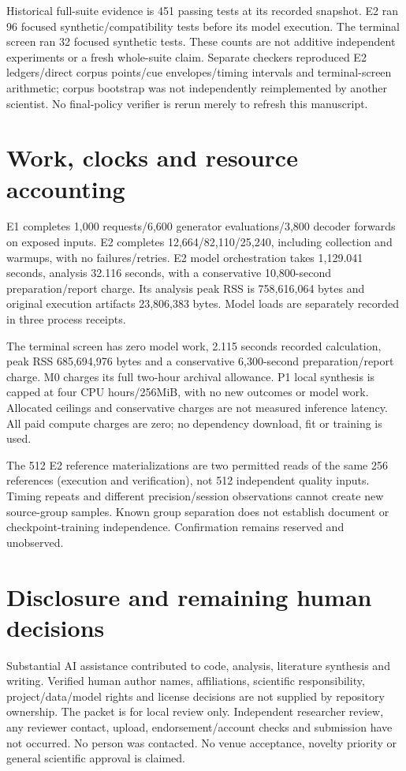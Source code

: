 \documentclass[11pt]{article}
\begin{document}
Historical full-suite evidence is 451 passing tests at its recorded snapshot. E2 ran 96 focused synthetic/compatibility tests before its model execution. The terminal screen ran 32 focused synthetic tests. These counts are not additive independent experiments or a fresh whole-suite claim. Separate checkers reproduced E2 ledgers/direct corpus points/cue envelopes/timing intervals and terminal-screen arithmetic; corpus bootstrap was not independently reimplemented by another scientist. No final-policy verifier is rerun merely to refresh this manuscript.

\section{Work, clocks and resource accounting}
E1 completes 1,000 requests/6,600 generator evaluations/3,800 decoder forwards on exposed inputs. E2 completes 12,664/82,110/25,240, including collection and warmups, with no failures/retries. E2 model orchestration takes 1,129.041 seconds, analysis 32.116 seconds, with a conservative 10,800-second preparation/report charge. Its analysis peak RSS is 758,616,064 bytes and original execution artifacts 23,806,383 bytes. Model loads are separately recorded in three process receipts.

The terminal screen has zero model work, 2.115 seconds recorded calculation, peak RSS 685,694,976 bytes and a conservative 6,300-second preparation/report charge. M0 charges its full two-hour archival allowance. P1 local synthesis is capped at four CPU hours/256MiB, with no new outcomes or model work. Allocated ceilings and conservative charges are not measured inference latency. All paid compute charges are zero; no dependency download, fit or training is used.

The 512 E2 reference materializations are two permitted reads of the same 256 references (execution and verification), not 512 independent quality inputs. Timing repeats and different precision/session observations cannot create new source-group samples. Known group separation does not establish document or checkpoint-training independence. Confirmation remains reserved and unobserved.

\section{Disclosure and remaining human decisions}
Substantial AI assistance contributed to code, analysis, literature synthesis and writing. Verified human author names, affiliations, scientific responsibility, project/data/model rights and license decisions are not supplied by repository ownership. The packet is for local review only. Independent researcher review, any reviewer contact, upload, endorsement/account checks and submission have not occurred. No person was contacted. No venue acceptance, novelty priority or general scientific approval is claimed.
\end{document}
